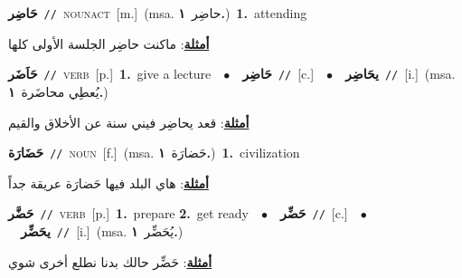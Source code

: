 \documentclass[10pt,a4paper,twoside]{article} %
\begin{document}
\begin{multicols}{2}
{\setlength\topsep{0pt}\textbf{\foreignlanguage{arabic}{حَاضِر}}\ {\color{gray}\texttt{//}\color{black}}\ \textsc{noun\textunderscore act}\ [m.]\ \color{gray}(msa. \foreignlanguage{arabic}{حاضِر}~\foreignlanguage{arabic}{\textbf{١.}})\color{black}\ \textbf{1.}~attending\  \begin{flushright}\color{gray}\foreignlanguage{arabic}{\textbf{\underline{\foreignlanguage{arabic}{أمثلة}}}: ماكنت حاضِر الجلسة الأولى كلها}\end{flushright}\color{black}} \vspace{2mm}

{\setlength\topsep{0pt}\textbf{\foreignlanguage{arabic}{حَاَضَر}}\ {\color{gray}\texttt{//}\color{black}}\ \textsc{verb}\ [p.]\ \textbf{1.}~give a lecture\ \ $\bullet$\ \ \setlength\topsep{0pt}\textbf{\foreignlanguage{arabic}{حَاضِر}}\ {\color{gray}\texttt{//}\color{black}}\ [c.]\ \ $\bullet$\ \ \setlength\topsep{0pt}\textbf{\foreignlanguage{arabic}{يحَاضِر}}\ {\color{gray}\texttt{//}\color{black}}\ [i.]\ \color{gray}(msa. \foreignlanguage{arabic}{يُعطِي محاضَرة}~\foreignlanguage{arabic}{\textbf{١.}})\color{black}\  \begin{flushright}\color{gray}\foreignlanguage{arabic}{\textbf{\underline{\foreignlanguage{arabic}{أمثلة}}}: قعد يحاضِر فيني سنة عن الأخلاق والقيم}\end{flushright}\color{black}} \vspace{2mm}

{\setlength\topsep{0pt}\textbf{\foreignlanguage{arabic}{حَضَارَة}}\ {\color{gray}\texttt{//}\color{black}}\ \textsc{noun}\ [f.]\ \color{gray}(msa. \foreignlanguage{arabic}{حَضارَة}~\foreignlanguage{arabic}{\textbf{١.}})\color{black}\ \textbf{1.}~civilization\  \begin{flushright}\color{gray}\foreignlanguage{arabic}{\textbf{\underline{\foreignlanguage{arabic}{أمثلة}}}: هاي البلد فيها حَضارَة عريقة جداً}\end{flushright}\color{black}} \vspace{2mm}

{\setlength\topsep{0pt}\textbf{\foreignlanguage{arabic}{حَضَّر}}\ {\color{gray}\texttt{//}\color{black}}\ \textsc{verb}\ [p.]\ \textbf{1.}~prepare  \textbf{2.}~get ready\ \ $\bullet$\ \ \setlength\topsep{0pt}\textbf{\foreignlanguage{arabic}{حَضِّر}}\ {\color{gray}\texttt{//}\color{black}}\ [c.]\ \ $\bullet$\ \ \setlength\topsep{0pt}\textbf{\foreignlanguage{arabic}{يحَضِّر}}\ {\color{gray}\texttt{//}\color{black}}\ [i.]\ \color{gray}(msa. \foreignlanguage{arabic}{يُحَضِّر}~\foreignlanguage{arabic}{\textbf{١.}})\color{black}\  \begin{flushright}\color{gray}\foreignlanguage{arabic}{\textbf{\underline{\foreignlanguage{arabic}{أمثلة}}}: حَضِّر حالك بدنا نطلع أخرى شوي}\end{flushright}\color{black}} \vspace{2mm}


\end{multicols}
\end{document}

